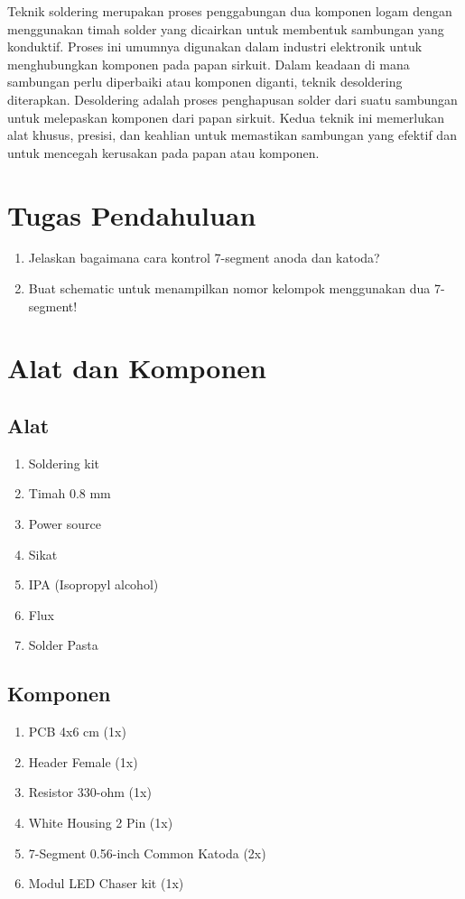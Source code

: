 Teknik soldering merupakan proses penggabungan dua komponen logam dengan menggunakan timah solder yang dicairkan untuk membentuk sambungan yang konduktif. 
Proses ini umumnya digunakan dalam industri elektronik untuk menghubungkan komponen pada papan sirkuit. Dalam keadaan di mana sambungan perlu diperbaiki 
atau komponen diganti, teknik desoldering diterapkan. Desoldering adalah proses penghapusan solder dari suatu sambungan untuk melepaskan komponen dari papan sirkuit. 
Kedua teknik ini memerlukan alat khusus, presisi, dan keahlian untuk memastikan sambungan yang efektif dan untuk mencegah kerusakan pada papan atau komponen.


\section{Tugas Pendahuluan}
\begin{enumerate}
    \item Jelaskan bagaimana cara kontrol 7-segment anoda dan katoda?
    \item Buat schematic untuk menampilkan nomor kelompok menggunakan dua 7-segment!
\end{enumerate}

\section{Alat dan Komponen}
\subsection{Alat}
\begin{enumerate}
    \item Soldering kit
    \item Timah 0.8 mm
    \item Power source
    \item Sikat 
    \item IPA (Isopropyl alcohol)
    \item Flux
    \item Solder Pasta
\end{enumerate}

\subsection{Komponen}
\begin{enumerate}
    \item PCB 4x6 cm                        (1x)
    \item Header Female                     (1x)
    \item Resistor 330-ohm 			        (1x)
    \item White Housing 2 Pin			    (1x)
    \item 7-Segment 0.56-inch Common Katoda	(2x)
    \item Modul LED Chaser kit              (1x)
\end{enumerate}
